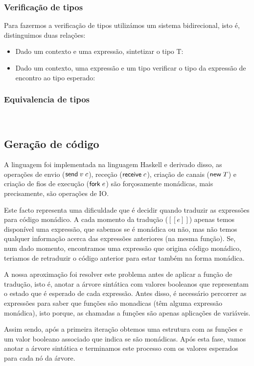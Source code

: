 \subsubsection{Verificação de tipos}
Para fazermos a verificação de tipos utilizámos um sistema bidirecional, isto é, distinguimos duas relações:
\begin{itemize}
\item Dado um contexto e uma expressão, sintetizar o tipo T: 
\item Dado um contexto, uma expressão e um tipo verificar o tipo da expressão de encontro ao tipo esperado:

\end{itemize}

\subsubsection{Equivalencia de tipos}
    \\

\subsection{Geração de código}
A linguagem foi implementada na linguagem Haskell e derivado disso, as operações de envio ($\mathsf{send}\;v\; c$), receção ($\mathsf{receive}\;c$), criação de canais ($\mathsf{new}\;T$) e criação de fios de execução ($\mathsf{fork}\;e$) são forçosamente monádicas, mais precisamente, são operações de IO.

Este facto representa uma dificuldade que é decidir quando traduzir as expressões para código monádico. A cada momento da tradução ($[\![e]\!]$) apenas temos disponível uma expressão, que sabemos se é monádica ou não, mas não temos qualquer informação acerca das expressões anteriores (na mesma função). Se, num dado momento, encontramos uma expressão que origina código monádico, teriamos de retraduzir o código anterior para estar também na forma monádica.

A nossa aproximação foi resolver este problema antes de aplicar a função de tradução, isto é, anotar a árvore sintática com valores booleanos que representam o estado que é esperado de cada expressão. Antes disso, é necessário percorrer as expressões para saber que funções são monadicas (têm alguma expressão monádica), isto porque, as chamadas a funções são apenas aplicações de variáveis.

Assim sendo, após a primeira iteração obtemos uma estrutura com as funções e um valor booleano associado que indica se são monádicas. Após esta fase, vamos anotar a árvore sintática e terminamos este processo com os valores esperados para cada nó da árvore.

